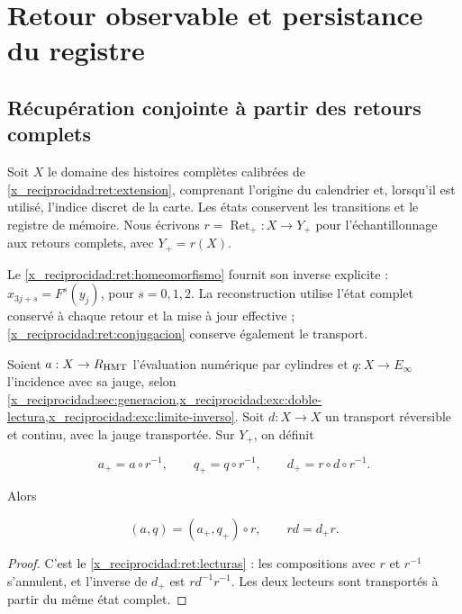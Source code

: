 \chapter{Retour observable et persistance du registre}
\label{x_reciprocidad:nuclear:9}
\section{Récupération conjointe à partir des retours complets}

Soit \(X\) le domaine des histoires complètes calibrées de
\cref{x_reciprocidad:ret:extension}, comprenant l’origine du calendrier et, lorsqu’il est
utilisé, l’indice discret de la carte. Les états conservent les
transitions et le registre de mémoire. Nous écrivons
\(r=\operatorname{Ret}_+:X\to Y_+\) pour l’échantillonnage aux retours
complets, avec \(Y_+=r(X)\).

Le \cref{x_reciprocidad:ret:homeomorfismo} fournit son inverse explicite :
\(x_{3j+s}=F^s(y_j)\), pour \(s=0,1,2\). La reconstruction utilise
l’état complet conservé à chaque retour et la mise à jour
effective ; \eqref{x_reciprocidad:ret:conjugacion} conserve également le transport.

Soient \(a:X\to R_{\rm HMT}\) l’évaluation numérique par cylindres et
\(q:X\to E_\infty\) l’incidence avec sa jauge, selon
\cref{x_reciprocidad:sec:generacion,x_reciprocidad:exc:doble-lectura,x_reciprocidad:exc:limite-inverso}.
Soit \(d:X\to X\) un transport réversible et continu, avec la jauge
transportée. Sur \(Y_+\), on définit



\[
a_+=a\circ r^{-1},\qquad q_+=q\circ r^{-1},\qquad d_+=r\circ d\circ r^{-1}.
\]



Alors



\begin{equation}
\boxed{(a,q)=(a_+,q_+)\circ r,\qquad rd=d_+r.}
\label{x_reciprocidad:nuc09:lecturas}
\end{equation}



\begin{proof}
C’est le \cref{x_reciprocidad:ret:lecturas} : les compositions avec \(r\)
et \(r^{-1}\) s’annulent, et l’inverse de \(d_+\) est \(rd^{-1}r^{-1}\).
Les deux lecteurs sont transportés à partir du même état complet.
\end{proof}

